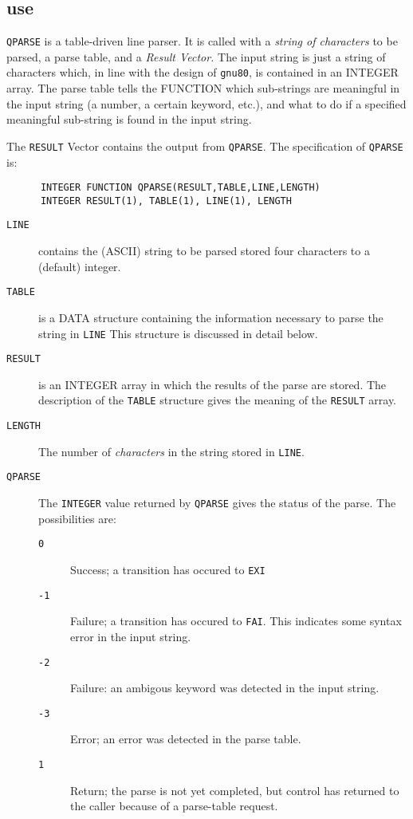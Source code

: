 \subsection{ use}
{\tt QPARSE} is a table-driven line parser. It is called with a 
{\em string of characters} to
be parsed, a parse table, and a {\em Result Vector.} 
The input string is just
a string of characters which, in line with the design
of {\tt gnu80}, is contained in an INTEGER array.  
The parse table tells the FUNCTION which sub-strings are meaningful
in the input string (a number, a certain keyword,
etc.), and what to do if a specified meaningful sub-string 
is found in the input string.

The {\tt RESULT} Vector contains the output from {\tt QPARSE}. 
The specification of {\tt QPARSE} is:
\begin{verbatim}
      INTEGER FUNCTION QPARSE(RESULT,TABLE,LINE,LENGTH)
      INTEGER RESULT(1), TABLE(1), LINE(1), LENGTH
\end{verbatim}
\begin{description}
\item[{\tt LINE}] contains the (ASCII) string to be parsed
stored four characters to a (default) integer.
\item[{\tt TABLE}] is a DATA structure containing the information necessary to
parse the string in {\tt LINE}
This structure is discussed in detail below.
\item[{\tt RESULT}] is an INTEGER array in which the results of the parse
are stored. The description of the {\tt TABLE} structure
gives the meaning of the {\tt RESULT} array.
\item[{\tt LENGTH}] The number of {\em characters} in the string stored
in {\tt LINE}.
\item[{\tt QPARSE}] The {\tt INTEGER} value returned by
{\tt QPARSE} gives the status of the
parse. The possibilities are:
\begin{description}
\item[{\tt 0}] Success; a transition has occured to {\tt EXI}
\item[{\tt -1}]  Failure; a transition has occured to {\tt FAI}. This
indicates some syntax error in the input string.
\item[{\tt -2}]    Failure: an ambigous keyword was detected in the
input string.
\item[{\tt -3}]  Error; an error was detected in the parse table.
\item[{\tt 1}]      Return; the parse is not yet completed, but
control has returned to the caller because of a
parse-table request.
\end{description}
\end{description}
